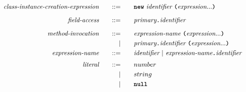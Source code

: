 \begin{alignat*}{9}
&& \textit{class-instance-creation-expression}   && \quad ::= & \quad && \textbf{\texttt{new}} \ \textit{identifier} \ \textbf{\texttt{(}} \textit{expression} ... \textbf{\texttt{)}} && \\[2mm]
&& \textit{field-access}                         && \quad ::= & \quad && \textit{primary} \textbf{\texttt{.}} \textit{identifier} && \\[2mm]
&& \textit{method-invocation}                    && \quad ::= & \quad && \textit{expression-name} \ \textbf{\texttt{(}} \textit{expression} ... \textbf{\texttt{)}} && \\
&&                                               &&         | & \quad && \textit{primary} \textbf{\texttt{.}} \textit{identifier} \ \textbf{\texttt{(}} \textit{expression} ... \textbf{\texttt{)}} && \\
&& \textit{expression-name}                      && \quad ::= & \quad && \textit{identifier} \ | \ \textit{expression-name} \textbf{\texttt{.}} \textit{identifier} && \\[1mm]
&& \textit{literal}                              && \quad ::= & \quad && number && \\
&&                                               &&         | & \quad && string && \\
&&                                               &&         | & \quad && \textbf{\texttt{null}} && \\[2mm]
\end{alignat*}
